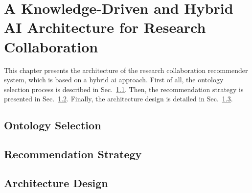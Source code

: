 \chapter{A Knowledge-Driven and Hybrid AI Architecture for Research Collaboration}\label{chap:Knowledge-DrivenArchitecture}
This chapter presents the architecture of the research collaboration recommender system, which is based on a hybrid \gls{ai} approach.
First of all, the ontology selection process is described in Sec.~\ref{sec:ontology-selection}.
Then, the recommendation strategy is presented in Sec.~\ref{sec:recommendation-strategy}.
Finally, the architecture design is detailed in Sec.~\ref{sec:architecture-design}.


\section{Ontology Selection}\label{sec:ontology-selection}


\section{Recommendation Strategy}\label{sec:recommendation-strategy}


\section{Architecture Design}\label{sec:architecture-design}
